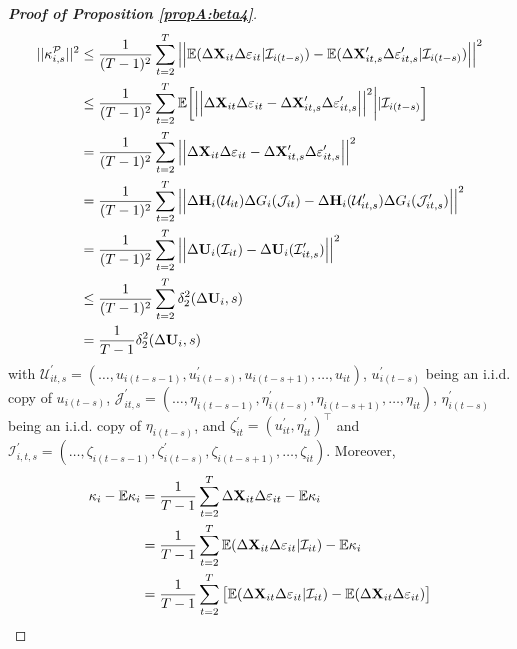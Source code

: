 \begin{proof}[\textnormal{\textbf{Proof of Proposition \ref{propA:beta4}}}]
{\color{red}\begin{align*}
||\kappa_{i, s}^{\mathcal{P}}||^2 &\leq \frac{1}{(T-1)^2} \sum_{t=2}^T \Big|\Big| \mathbb{E} (\Delta \mathbf{X}_{it}\Delta \varepsilon_{it}|\mathcal{I}_{i(t-s)}) -\mathbb{E} (\Delta \mathbf{X}_{it, s}^\prime\Delta \varepsilon_{it, s}^\prime|\mathcal{I}_{i(t-s)}) \Big|\Big|^2 \\
&\leq \frac{1}{(T-1)^2} \sum_{t=2}^T \mathbb{E} \bigg[ \Big|\Big| \Delta \mathbf{X}_{it}\Delta \varepsilon_{it} -\Delta \mathbf{X}_{it, s}^\prime\Delta \varepsilon_{it, s}^\prime\Big|\Big|^2\bigg| |\mathcal{I}_{i(t-s)}\bigg] \\
&= \frac{1}{(T-1)^2} \sum_{t=2}^T \Big|\Big| \Delta \mathbf{X}_{it}\Delta \varepsilon_{it} -\Delta \mathbf{X}_{it, s}^\prime\Delta \varepsilon_{it, s}^\prime\Big|\Big|^2 \\
& = \frac{1}{(T-1)^2} \sum_{t=2}^T \Big|\Big| \Delta \mathbf{H}_i(\mathcal{U}_{it})  \Delta G_i(\mathcal{J}_{it}) - \Delta \mathbf{H}_i(\mathcal{U}_{it, s}^\prime)  \Delta G_i(\mathcal{J}_{it, s}^\prime)\Big|\Big|^2\\
& = \frac{1}{(T-1)^2} \sum_{t=2}^T \Big|\Big| \Delta \mathbf{U}_i(\mathcal{I}_{it})  - \Delta \mathbf{U}_i(\mathcal{I}_{it, s}^\prime) \Big|\Big|^2 \\
& \leq \frac{1}{(T-1)^2} \sum_{t=2}^T \delta_2^2(\Delta \mathbf{U}_i, s)\\
& = \frac{1}{T-1}\delta_2^2(\Delta \mathbf{U}_i, s)
\end{align*}}
with $\mathcal{U}_{it, s}^\prime = (\ldots, u_{i(t-s-1)}, u^\prime_{i(t-s)}, u_{i(t-s+1)}, \ldots, u_{it})$, $u_{i(t-s)}^\prime$ being an i.i.d. copy of $u_{i(t-s)}$, $\mathcal{J}_{it, s}^\prime = (\ldots, \eta_{i(t-s-1)}, \eta^\prime_{i(t-s)}, \eta_{i(t-s+1)}, \ldots, \eta_{it})$, $\eta_{i(t-s)}^\prime$ being an i.i.d. copy of $\eta_{i(t-s)}$, and $\zeta^\prime_{it} = (u_{it}^\prime, \eta_{it}^\prime)^\top$ and $\mathcal{I}_{i,t,s}^\prime =(\ldots, \zeta_{i(t-s-1)}, \zeta^\prime_{i(t-s)}, \zeta_{i(t-s+1)}, \ldots, \zeta_{it})$.
Moreover,
\begin{align*}
\kappa_i - \ex \kappa_i &= \frac{1}{T-1}\sum_{t=2}^T \Delta \mathbf{X}_{it}\Delta \varepsilon_{it} - \ex \kappa_i \\
&= \frac{1}{T-1}\sum_{t=2}^T \ex ( \Delta \mathbf{X}_{it}\Delta \varepsilon_{it}|\mathcal{I}_{it}) - \ex \kappa_i \\
&= \frac{1}{T-1}\sum_{t=2}^T \big[ \ex ( \Delta \mathbf{X}_{it}\Delta \varepsilon_{it}|\mathcal{I}_{it} ) - \ex ( \Delta\mathbf{X}_{it}\Delta \varepsilon_{it}) \big] \\

\end{align*}
\end{proof}
